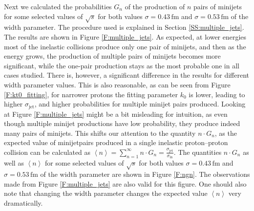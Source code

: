 \documentclass[a4paper, twoside, english, 12pt]{report}
\begin{document}
Next we calculated the probabilities $G_n$ of the production of $n$ pairs of minijets for some selected values of $\sqrt{s}$ for both values $\sigma = 0.43 \,\text{fm}$ and $\sigma = 0.53 \,\text{fm}$ of the width parameter. The procedure used is explained in Section \ref{SS:multiple_jets}. The results are shown in Figure \ref{F:multiple_jets}. As expected, at lower energies most of the inelastic collisions produce only one pair of minijets, and then as the energy grows, the production of multiple pairs of minijets becomes more significant, while the one-pair production stays as the most probable one in all cases studied. There is, however, a significant difference in the results for different width parameter values. This is also reasonable, as can be seen from Figure \ref{F:kt0_fitting}, for narrower protons the fitting parameter $k_0$ is lower, leading to higher $\sigma_{\text{jet}}$, and higher probabilities for multiple minijet pairs produced.
Looking at Figure \ref{F:multiple_jets} might be a bit misleading for intuition, as even though multiple minijet productions have low probability, they produce indeed many pairs of minijets. This shifts our attention to the quantity $n\cdot G_n$, as the expected value of minijetpairs produced in a single inelastic proton--proton collision can be calculated as $\left\langle n \right\rangle = \sum\limits_{n=1}^{\infty}n\cdot G_n = \frac{\sigma_{\text{jet}}}{\sigma_{\text{in}}}$. The quantities $n\cdot G_n$ as well as $\left\langle n \right\rangle$ for some selected values of $\sqrt{s}$ for both values $\sigma = 0.43 \,\text{fm}$ and $\sigma = 0.53 \,\text{fm}$ of the width parameter are shown in Figure \ref{F:ngn}. The observations made from Figure \ref{F:multiple_jets} are also valid for this figure. One should also note that changing the width parameter changes the expected value $\left\langle n \right\rangle$ very dramatically.
\end{document}
